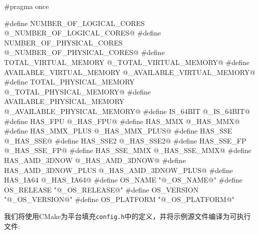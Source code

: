 \begin{codebox}[cpp]
#pragma once

#define NUMBER_OF_LOGICAL_CORES @_NUMBER_OF_LOGICAL_CORES@
#define NUMBER_OF_PHYSICAL_CORES @_NUMBER_OF_PHYSICAL_CORES@
#define TOTAL_VIRTUAL_MEMORY @_TOTAL_VIRTUAL_MEMORY@
#define AVAILABLE_VIRTUAL_MEMORY @_AVAILABLE_VIRTUAL_MEMORY@
#define TOTAL_PHYSICAL_MEMORY @_TOTAL_PHYSICAL_MEMORY@
#define AVAILABLE_PHYSICAL_MEMORY @_AVAILABLE_PHYSICAL_MEMORY@
#define IS_64BIT @_IS_64BIT@
#define HAS_FPU @_HAS_FPU@
#define HAS_MMX @_HAS_MMX@
#define HAS_MMX_PLUS @_HAS_MMX_PLUS@
#define HAS_SSE @_HAS_SSE@
#define HAS_SSE2 @_HAS_SSE2@
#define HAS_SSE_FP @_HAS_SSE_FP@
#define HAS_SSE_MMX @_HAS_SSE_MMX@
#define HAS_AMD_3DNOW @_HAS_AMD_3DNOW@
#define HAS_AMD_3DNOW_PLUS @_HAS_AMD_3DNOW_PLUS@
#define HAS_IA64 @_HAS_IA64@
#define OS_NAME "@_OS_NAME@"
#define OS_RELEASE "@_OS_RELEASE@"
#define OS_VERSION "@_OS_VERSION@"
#define OS_PLATFORM "@_OS_PLATFORM@"
\end{codebox}


我们将使用CMake为平台填充\texttt{config.h}中的定义，并将示例源文件编译为可执行文件:

